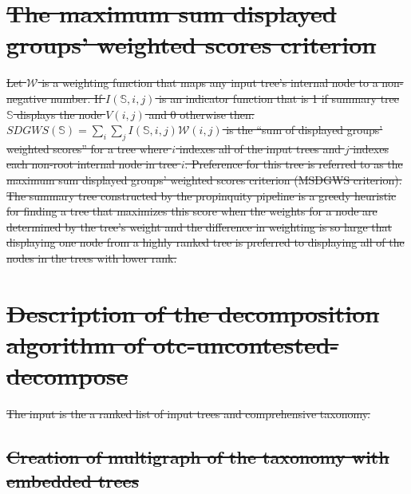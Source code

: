 \documentclass[fleqn,12pt,lineno,english]{wlpeerj}
\providecommand{\DIFdeltex}[1]{{\protect\color{red}\sout{#1}}}                      %
\providecommand{\DIFdelbegin}{} %
\providecommand{\DIFdel}[1]{\texorpdfstring{\DIFdeltex{#1}}{}} %
\begin{document}
 \DIFdelbegin %

\section{\DIFdel{The maximum sum displayed groups' weighted scores criterion}}%
\addtocounter{section}{-1}%

\DIFdel{Let $\mathcal{W}$ is a weighting function that maps any input tree's
internal node to a non-negative number. If $I(\mathbb{S},i,j)$ is
an indicator function that is 1 if summary tree $\mathbb{S}$ displays
the node $V(i,j)$ and 0 otherwise then: $SDGWS(\mathbb{S})=\sum_{i}\sum_{j}I(\mathbb{S},i,j)\mathcal{W}(i,j)$
is the ``sum of displayed groups' weighted scores'' for a tree where
$i$ indexes all of the input trees and $j$ indexes each non-root
internal node in tree $i$. Preference for this tree is referred to
as the maximum sum displayed groups' weighted scores criterion (MSDGWS
criterion). The summary tree constructed by the propinquity pipeline
is a greedy heuristic for finding a tree that maximizes this score
when the weights for a node are determined by the tree's weight and
the difference in weighting is so large that displaying one node from
a highly ranked tree is preferred to displaying all of the nodes in
the trees with lower rank.
}%

\section{\DIFdel{Description of the decomposition algorithm of otc-uncontested-decompose}}%
\addtocounter{section}{-1}%

\DIFdel{The input is the a ranked list of input trees and comprehensive taxonomy. 
}%

\subsection{\DIFdel{Creation of multigraph of the taxonomy with embedded trees}}
\addtocounter{subsection}{-1}%
\end{document}
